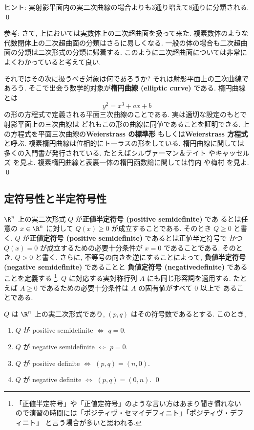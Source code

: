 \documentclass[12pt,twoside]{jarticle}
\begin{document}
\noindent
ヒント: 実射影平面内の実二次曲線の場合よりも3通り増えて8通りに分類される.
\qed

\medskip
\noindent
参考: さて, 上においては実数体上の二次超曲面を扱って来た. 
複素数体のような代数閉体上の二次超曲面の分類はさらに易しくなる.
一般の体の場合も二次超曲面の分類は二次形式の分類に帰着する.
このように二次超曲面については非常によくわかっていると考えて良い.

それではその次に扱うべき対象は何であろうか?
それは射影平面上の三次曲線であろう.
そこで出会う数学的対象が{\bf 楕円曲線 (elliptic curve)} である.
楕円曲線とは
\begin{equation*}
  y^2 = x^3 + ax + b
\end{equation*}
の形の方程式で定義される平面三次曲線のことである. 
実は適切な設定のもとで射影平面上の三次曲線は
どれもこの形の曲線に同値であることを証明できる.  
上の方程式を平面三次曲線の{\bf Weierstrass の標準形}
もしくは{\bf Weierstrass 方程式}と呼ぶ.
複素楕円曲線は位相的にトーラスの形をしている.
楕円曲線に関しては多くの入門書が発行されている.
たとえばシルヴァーマン＆テイト \cite{ST}やキャッセルズ \cite{cassels} を見よ.
複素楕円曲線と表裏一体の楕円函数論に関しては竹内 \cite{takeuchi} 
や梅村 \cite{umemura} を見よ.
\qed


\subsection{定符号性と半定符号性}

$\R^n$ 上の実二次形式 $Q$ が{\bf 正値半定符号 (positive semidefinite)} であ
るとは任意の $x\in\R^n$ に対して $Q(x)\ge 0$ が成立することである. 
そのとき $Q\ge 0$ と書く.
$Q$ が{\bf 正値定符号 (positive semidefinite)} であるとは正値半定符号で
かつ $Q(x)=0$ が成立するための必要十分条件が $x=0$ であることである.
そのとき, $Q>0$ と書く.
さらに, 不等号の向きを逆にすることによって, 
{\bf 負値半定符号 (negative semidefinite)} であることと
{\bf 負値定符号 (negativedefinite)} であることを定義する%
\footnote{「正値半定符号」や「正値定符号」のような言い方はあまり聞き慣れない
  ので演習の時間には「ポジティヴ・セマイデフィニト」「ポジティヴ・デフィニト」
  と言う場合が多いと思われる.}.
$Q$ に対応する実対称行列 $A$ にも同じ形容詞を適用する.
たとえば $A\ge 0$ であるための必要十分条件は $A$ の固有値がすべて $0$ 以上で
あることである.

\begin{question}
  $Q$ は $\R^n$ 上の実二次形式であり, $(p,q)$ はその符号数であるとする. 
  このとき, 
  \begin{enumerate}
  \item $Q$ が positive semidefinite $\iff$ $q=0$.
  \item $Q$ が negative semidefinite $\iff$ $p=0$.
  \item $Q$ が positive definite $\iff$ $(p,q)=(n,0)$.
  \item $Q$ が negative definite $\iff$ $(p,q)=(0,n)$.
    \qed
  \end{enumerate}
\end{question}
\end{document}
